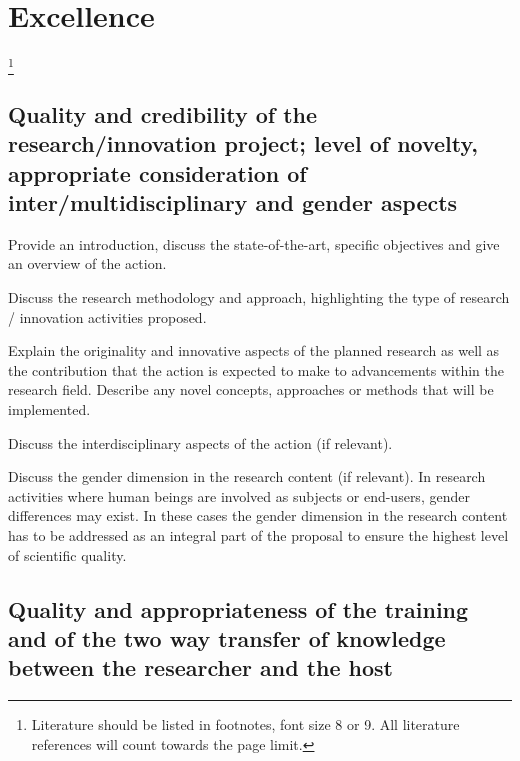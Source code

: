 
%

\markStartPageLimit

\section{Excellence}
\label{sec:excellence}\footnote{Literature should be listed in
footnotes, font size 8 or 9.  All literature references will count
towards the page limit.}

\subsection{Quality and credibility of the research/innovation
project; level of novelty, appropriate consideration of
inter/multidisciplinary and gender aspects}
\label{sec:excellence_quality}

Provide an introduction, discuss the state-of-the-art, specific
objectives and give an overview of the action.

\medskip\noindent
Discuss the research methodology and approach, highlighting the
type of research / innovation activities proposed.

\medskip\noindent
Explain the originality and innovative aspects of the planned
research as well as the contribution that the action is expected
to make to advancements within the research field. Describe any
novel concepts, approaches or methods that will be implemented.

\medskip\noindent
Discuss the interdisciplinary aspects of the action (if relevant).

\medskip\noindent
Discuss the gender dimension in the research content (if
relevant). In research activities where human beings are involved
as subjects or end-users, gender differences may exist. In these
cases the gender dimension in the research content has to be
addressed as an integral part of the proposal to ensure the
highest level of scientific quality.

\subsection{Quality and appropriateness of the training and of the
two way transfer of knowledge between the researcher and the host}
\label{sec:excellence_transfer}

